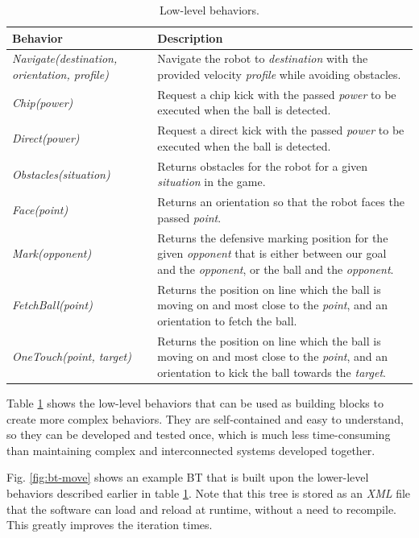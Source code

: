 \documentclass[runningheads]{llncs}
\begin{document}
\begin{table}
    \centering
    \footnotesize
    \caption{Low-level behaviors.}
    \label{tab:low-level-behaviors}
    \begin{tabular}{|p{}|p{}|}
        \hline
        \bf{Behavior} & \bf{Description} \\
        \hline
        {\itshape Navigate(destination, orientation, profile)} & Navigate the robot to \textit{destination} with the provided velocity \textit{profile} while avoiding obstacles.\\
        {\itshape Chip(power)} & Request a chip kick with the passed \textit{power} to be executed when the ball is detected.\\
        {\itshape Direct(power)} & Request a direct kick with the passed \textit{power} to be executed when the ball is detected.\\
        \hline
        {\itshape Obstacles(situation)} & Returns obstacles for the robot for a given \textit{situation} in the game.\\
        {\itshape Face(point)} & Returns an orientation so that the robot faces the passed \textit{point}.\\
        {\itshape Mark(opponent)} & Returns the defensive marking position for the given \textit{opponent} that is either between our goal and the \textit{opponent}, or the ball and the \textit{opponent}.\\
        {\itshape FetchBall(point)} & Returns the position on line which the ball is moving on and most close to the \textit{point}, and an orientation to fetch the ball.\\
        {\itshape OneTouch(point, target)} & Returns the position on line which the ball is moving on and most close to the \textit{point}, and an orientation to kick the ball towards the \textit{target}.\\
        \hline
    \end{tabular}
\end{table}

Table \ref{tab:low-level-behaviors} shows the low-level behaviors that can be used as building blocks to create more complex behaviors. They are self-contained and easy to understand, so they can be developed and tested once, which is much less time-consuming than maintaining complex and interconnected systems developed together.

Fig. \ref{fig:bt-move} shows an example BT that is built upon the lower-level behaviors described earlier in table \ref{tab:low-level-behaviors}. Note that this tree is stored as an \textit{XML} file that the software can load and reload at runtime, without a need to recompile. This greatly improves the iteration times.
\end{document}
